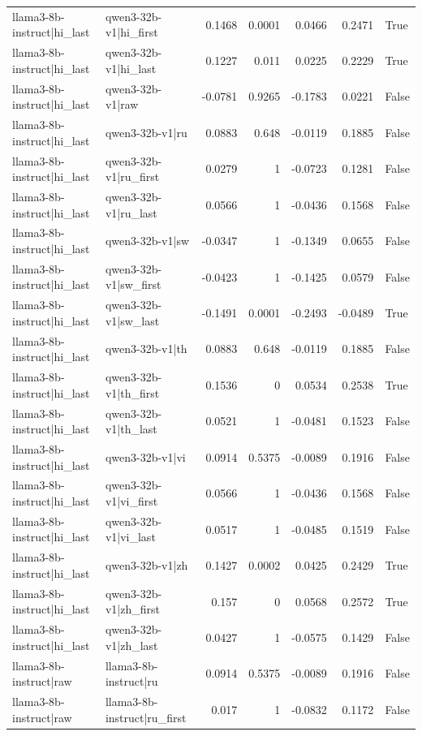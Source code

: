 \begin{table}
\begin{tabular}{l l r r r r l}
llama3-8b-instruct|hi_last & qwen3-32b-v1|hi_first & 0.1468 & 0.0001 & 0.0466 & 0.2471 & True \\
llama3-8b-instruct|hi_last & qwen3-32b-v1|hi_last & 0.1227 & 0.011 & 0.0225 & 0.2229 & True \\
llama3-8b-instruct|hi_last & qwen3-32b-v1|raw & -0.0781 & 0.9265 & -0.1783 & 0.0221 & False \\
llama3-8b-instruct|hi_last & qwen3-32b-v1|ru & 0.0883 & 0.648 & -0.0119 & 0.1885 & False \\
llama3-8b-instruct|hi_last & qwen3-32b-v1|ru_first & 0.0279 & 1 & -0.0723 & 0.1281 & False \\
llama3-8b-instruct|hi_last & qwen3-32b-v1|ru_last & 0.0566 & 1 & -0.0436 & 0.1568 & False \\
llama3-8b-instruct|hi_last & qwen3-32b-v1|sw & -0.0347 & 1 & -0.1349 & 0.0655 & False \\
llama3-8b-instruct|hi_last & qwen3-32b-v1|sw_first & -0.0423 & 1 & -0.1425 & 0.0579 & False \\
llama3-8b-instruct|hi_last & qwen3-32b-v1|sw_last & -0.1491 & 0.0001 & -0.2493 & -0.0489 & True \\
llama3-8b-instruct|hi_last & qwen3-32b-v1|th & 0.0883 & 0.648 & -0.0119 & 0.1885 & False \\
llama3-8b-instruct|hi_last & qwen3-32b-v1|th_first & 0.1536 & 0 & 0.0534 & 0.2538 & True \\
llama3-8b-instruct|hi_last & qwen3-32b-v1|th_last & 0.0521 & 1 & -0.0481 & 0.1523 & False \\
llama3-8b-instruct|hi_last & qwen3-32b-v1|vi & 0.0914 & 0.5375 & -0.0089 & 0.1916 & False \\
llama3-8b-instruct|hi_last & qwen3-32b-v1|vi_first & 0.0566 & 1 & -0.0436 & 0.1568 & False \\
llama3-8b-instruct|hi_last & qwen3-32b-v1|vi_last & 0.0517 & 1 & -0.0485 & 0.1519 & False \\
llama3-8b-instruct|hi_last & qwen3-32b-v1|zh & 0.1427 & 0.0002 & 0.0425 & 0.2429 & True \\
llama3-8b-instruct|hi_last & qwen3-32b-v1|zh_first & 0.157 & 0 & 0.0568 & 0.2572 & True \\
llama3-8b-instruct|hi_last & qwen3-32b-v1|zh_last & 0.0427 & 1 & -0.0575 & 0.1429 & False \\
llama3-8b-instruct|raw & llama3-8b-instruct|ru & 0.0914 & 0.5375 & -0.0089 & 0.1916 & False \\
llama3-8b-instruct|raw & llama3-8b-instruct|ru_first & 0.017 & 1 & -0.0832 & 0.1172 & False \\

\end{tabular}
\end{table}
